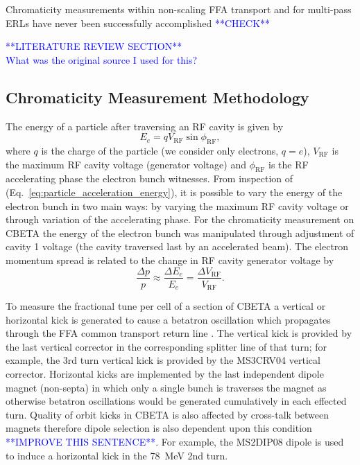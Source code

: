 \documentclass[../main.tex]{subfiles}
\begin{document}
Chromaticity measurements within non-scaling FFA transport and for multi-pass ERLs have never been successfully accomplished \textcolor{blue}{**CHECK**}

\textcolor{blue}{**LITERATURE REVIEW SECTION** \\ What was the original source I used for this? }

\subsection{Chromaticity Measurement Methodology}
\label{sec:chromaticity_measurement_methodology}

The energy of a particle after traversing an RF cavity is given by
\begin{equation}
E_{e} = qV_{\mathrm{RF}}\sin\phi_{\mathrm{RF}},
\label{eq:particle_acceleration_energy}
\end{equation}
where $q$ is the charge of the particle (we consider only electrons, $q=e$), $V_{\mathrm{RF}}$ is the maximum RF cavity voltage (generator voltage) and $\phi_{\mathrm{RF}}$ is the RF accelerating phase the electron bunch witnesses. From inspection of (Eq.~\ref{eq:particle_acceleration_energy}), it is possible to vary the energy of the electron bunch in two main ways: by varying the maximum RF cavity voltage or through variation of the accelerating phase. For the chromaticity measurement on CBETA the energy of the electron bunch was manipulated through adjustment of cavity 1 voltage (the cavity traversed last by an accelerated beam). The electron momentum spread is related to the change in RF cavity generator voltage by
\begin{equation}
\frac{\Delta p}{p}\approx \frac{\Delta E_{e}}{E_{e}} = \frac{\Delta V_{\mathrm{RF}}}{V_{\mathrm{RF}}}.    
\end{equation}

To measure the fractional tune per cell of a section of CBETA a vertical or horizontal kick is generated to cause a betatron oscillation which propagates through the FFA common transport return line \cite{gulliford2021measurement}. The vertical kick is provided by the last vertical corrector in the corresponding splitter line of that turn; for example, the 3rd turn vertical kick is provided by the MS3CRV04 vertical corrector. Horizontal kicks are implemented by the last independent dipole magnet (non-septa) in which only a single bunch is traverses the magnet as otherwise betatron oscillations would be generated cumulatively in each effected turn. Quality of orbit kicks in CBETA is also affected by cross-talk between magnets therefore dipole selection is also dependent upon this condition \textcolor{blue}{**IMPROVE THIS SENTENCE**}. For example, the MS2DIP08 dipole is used to induce a horizontal kick in the 78~\si{\mega\electronvolt} 2nd turn.
\end{document}
